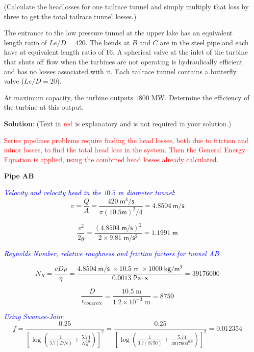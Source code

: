 \documentclass[10pt,oneside]{amsart}
\begin{document}
(Calculate the headlosses for one tailrace tunnel and simply multiply that loss by three to get the total
tailrace tunnel losses.)

\par\medskip
The entrance to the low pressure tunnel at the upper lake has an equivalent length ratio of $Le/D=420$. The bends at
$B$ and $C$ are in the steel pipe and each have at equivalent length ratio of $16$. A spherical valve at the
inlet of the turbine that shuts off flow when the turbines are not operating is hydraulically efficient and has no
losses associated with it. Each tailrace tunnel contains a butterfly valve ($Le/D=20$).
\par\medskip
At maximum capacity, the turbine outputs $1800 \text{ MW}$. Determine the efficiency of the turbine at this output.




\vfill
\newpage



\textbf{Solution}: (Text in \textcolor{red}{red} is	explanatory and is not required in your solution.)

\textcolor{red}{Series pipelines problems require finding the head losses, both due to friction and minor
	losses, to find the total head loss in the system. Then the General Energy Equation is applied, using the combined head losses already
calculated.}

\textbf{Pipe AB}

\textcolor{blue}{\em Velocity and velocity head in the $10.5$ m diameter tunnel}:\\

\[
	v = \frac{Q}{A} = \frac{420\mathsf{\;m^3/s}}{\pi(10.5\mathsf{ m})^2/4}=4.8504\mathsf{\ m/s}
\]

\[
	\frac{v^2}{2g} = \frac{(4.8504\mathsf{\;m/s})^2}{2\times9.81\mathsf{\;m/s^2}} = 1.1991\mathsf{\; m}
\]

\textcolor{blue}{\em Reynolds Number, relative roughness and friction factors for tunnel AB}:

\[
	N_R = \frac{vD\rho}{\eta} =
	\frac{4.8504\mathsf{\;m/s\;}\times10.5\mathsf{\;m\;}\times1000\mathsf{\;kg/m^3}}{0.0013\;\mathsf{Pa\cdot s}} =
	39176000
\]

\[
	\frac{D}{\epsilon_{concrete}} = \frac{10.5\;\text{m}}{1.2\times10^{-3}\text{ m}} = 8750
\]

\textcolor{blue}{\em Using Swamee-Jain}:
\[
	f = \frac{0.25}{\left[\log\left(\frac{1}{3.7(D/\epsilon)}+\frac{5.74}{N_R^{0.9}}\right)\right]^2} =
	\frac{0.25}{\left[\log\left(\frac{1}{3.7(8750)}+\frac{5.74}{3917600^{0.9}}\right)\right]^2}=0.012354
\]
\end{document}
